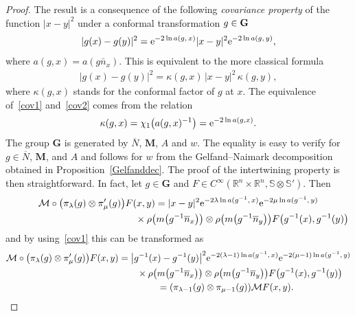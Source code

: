 \documentclass[pdftex]{sigma}
\numberwithin{equation}{section}
\begin{document}
\begin{proof} The result is a consequence of the following \emph{covariance property} of the function $\vert x-y\vert^2$ under a conformal transformation $g\in \bf G$
\begin{gather}\label{cov1}
\vert g(x)-g(y)\vert^2 = {\rm e}^{-2\ln a(g,\, x)} \vert x-y\vert^2 {\rm e}^{-2\ln a(g,\, y)} ,
\end{gather}
where $a(g,x) = a(g\bar{n}_x)$. This is equivalent to the more classical formula
\begin{gather}\label{cov2}
\vert g(x)-g(y)\vert^2 = \kappa(g,x)\, \vert x-y\vert^2\, \kappa(g,y),
\end{gather}
where $\kappa(g,x)$ stands for the conformal factor of $g$ at $x$. The equivalence of~\eqref{cov1} and~\eqref{cov2} comes from the relation
\begin{gather*}
\kappa(g,x) = \chi_1\big(a(g,x) ^{-1}\big) = {\rm e}^{-2\ln a(g,x)}.
\end{gather*}
 The group $\mathbf G$ is generated by $\overline N$, $\mathbf M$, $A$ and $w$. The equality is easy to verify for $g\in \overline N$, $\mathbf M$, and $A$ and follows for $w$ from the Gelfand--Naimark decomposition obtained in Proposition~\ref{Gelfanddec}.
 The proof of the intertwining property is then straightforward. In fact, let $g\in \mathbf G$ and $F\in C^\infty(\mathbb R^n\times \mathbb R^n, \mathbb S\otimes \mathbb S')$. Then
 \begin{gather*}
 \mathcal{M}\circ \big(\pi_\lambda(g)\otimes \pi'_\mu(g)\big)F (x,y)
= \vert x-y\vert^2 \mathrm{e}^{-2\lambda \ln a(g^{-1},\,x)} \mathrm{e}^{-2\mu \ln a(g^{-1},\,y)}
\\ \hphantom{ \mathcal{M}\circ \big(\pi_\lambda(g)\otimes \pi'_\mu(g)\big)F (x,y)=}
{}\times \rho\big(m\big(g^{-1} \overline n_x\big)\big)\otimes \rho\big(m\big(g^{-1}\overline n_y\big)\big) F\big(g^{-1}(x), g^{-1}(y)\big)
 \end{gather*}
 and by using~\eqref{cov1} this can be transformed as
\begin{gather*}
\mathcal{M}\circ \big(\pi_\lambda(g)\otimes \pi'_\mu(g)\big)F (x,y)
= \big\vert g^{-1}(x) -g^{-1}(y) \big\vert^2 \mathrm{e}^{-2(\lambda-1) \ln a(g^{-1},\,x)}\mathrm{e}^{-2(\mu-1) \ln a(g^{-1},\,y)}
\\ \hphantom{\mathcal{M}\circ \big(\pi_\lambda(g)\otimes \pi'_\mu(g)\big)F (x,y)= }
{}\times \rho\big(m\big(g^{-1} \overline n_x\big)\big)
\otimes \rho\big(m\big(g^{-1}\overline n_y\big)\big)F\big(g^{-1}(x), g^{-1}(y)\big)
\\ \hphantom{\mathcal{M}\circ \big(\pi_\lambda(g)\otimes \pi'_\mu(g)\big)F (x,y)}
{} = (\pi_{\lambda-1}(g) \otimes \pi_{\mu-1}(g)) \mathcal{M} F(x,y) .
 \tag*{\qed}
\end{gather*}
\renewcommand{\qed}{}
\end{proof}
\end{document}
